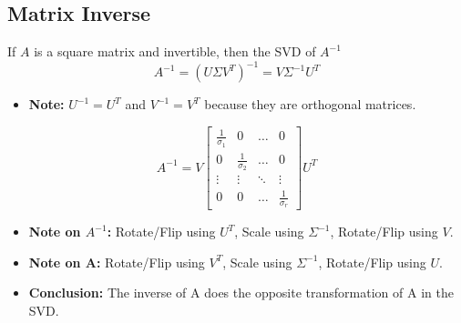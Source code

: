 \subsection{Matrix Inverse}
\begin{definition}
    If \( A \) is a square matrix and invertible, then the SVD of $A^{-1}$
    \begin{equation*}
    A^{-1} = (U \Sigma V^T)^{-1} = V \Sigma^{-1} U^T
    \end{equation*}
    \begin{itemize}
        \item \textbf{Note:} $U^{-1} = U^T$ and $V^{-1} = V^T$ because they are orthogonal matrices.
    \end{itemize}

    \begin{equation*}
    A^{-1} = V 
    \begin{bmatrix}
    \frac{1}{\sigma_1} & 0 & \ldots & 0 \\
    0 & \frac{1}{\sigma_2} & \ldots & 0 \\
    \vdots & \vdots & \ddots & \vdots \\
    0 & 0 & \ldots & \frac{1}{\sigma_r}
    \end{bmatrix}
    U^T
    \end{equation*}
    \begin{itemize}
        \item \textbf{Note on $A^{-1}$:} Rotate/Flip using \( U^T \), Scale using \( \Sigma^{-1} \), Rotate/Flip using \( V \).
        \item \textbf{Note on A:} Rotate/Flip using \( V^T \), Scale using \( \Sigma^{-1} \), Rotate/Flip using \( U \).
        \item \textbf{Conclusion:} The inverse of A does the opposite transformation of A in the SVD.
    \end{itemize}
\end{definition}

